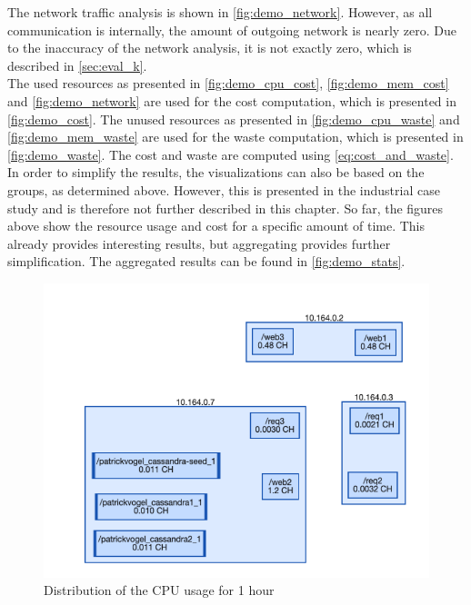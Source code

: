 \noindent
The network traffic analysis is shown in \autoref{fig:demo_network}. However, as all communication is internally, the amount of outgoing network is nearly zero. Due to the inaccuracy of the network analysis, it is not exactly zero, which is described in \autoref{sec:eval_k}.\\

\noindent
The used resources as presented in \autoref{fig:demo_cpu_cost}, \autoref{fig:demo_mem_cost} and \autoref{fig:demo_network} are used for the cost computation, which is presented in \autoref{fig:demo_cost}. The unused resources as presented in \autoref{fig:demo_cpu_waste} and \autoref{fig:demo_mem_waste} are used for the waste computation, which is presented in \autoref{fig:demo_waste}. The cost and waste are computed using \autoref{eq:cost_and_waste}.\\

\noindent
In order to simplify the results, the visualizations can also be based on the groups, as determined above. However, this is presented in the industrial case study and is therefore not further described in this chapter. So far, the figures above show the resource usage and cost for a specific amount of time. This already provides interesting results, but aggregating provides further simplification. The aggregated results can be found in \autoref{fig:demo_stats}.

\begin{figure}
    \centering
    \includegraphics[width=\textwidth]{gfx/demo_cpu_cost}
    \caption{Distribution of the CPU usage for 1 hour}
    \label{fig:demo_cpu_cost}
\end{figure}

